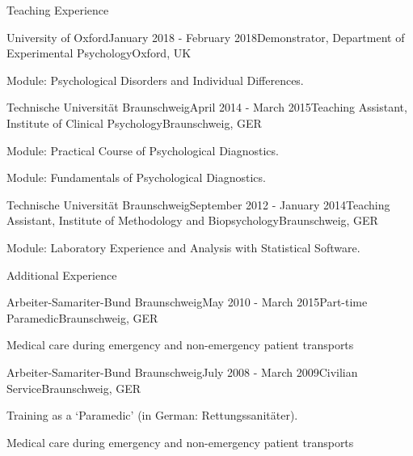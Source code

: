 \documentclass{resume} %
\begin{document}


\begin{rSection}{Teaching Experience}

\begin{rSubsection}{University of Oxford}{January 2018 - February 2018}{Demonstrator, Department of Experimental Psychology}{Oxford, UK}
\item Module: Psychological Disorders and Individual Differences.
\end{rSubsection}

\begin{rSubsection}{Technische Universit{\"a}t Braunschweig}{April 2014 - March 2015}{Teaching Assistant, Institute of Clinical Psychology}{Braunschweig, GER}
\item Module: Practical Course of Psychological Diagnostics.
\item Module: Fundamentals of Psychological Diagnostics.
\end{rSubsection}

\begin{rSubsection}{Technische Universit{\"a}t Braunschweig}{September 2012 - January 2014}{Teaching Assistant, Institute of Methodology and Biopsychology}{Braunschweig, GER}
\item Module: Laboratory Experience and Analysis with Statistical Software.
\end{rSubsection}

\end{rSection}


\begin{rSection}{Additional Experience}

\begin{rSubsection}{Arbeiter-Samariter-Bund Braunschweig}{May 2010 - March 2015}{Part-time Paramedic}{Braunschweig, GER}
\item Medical care during emergency and non-emergency patient transports
\end{rSubsection}

\begin{rSubsection}{Arbeiter-Samariter-Bund Braunschweig}{July 2008 - March 2009}{Civilian Service}{Braunschweig, GER}
\item Training as a `Paramedic' (in German: Rettungssanit{\"a}ter).
\item Medical care during emergency and non-emergency patient transports
\end{rSubsection}

\end{rSection}
\end{document}
